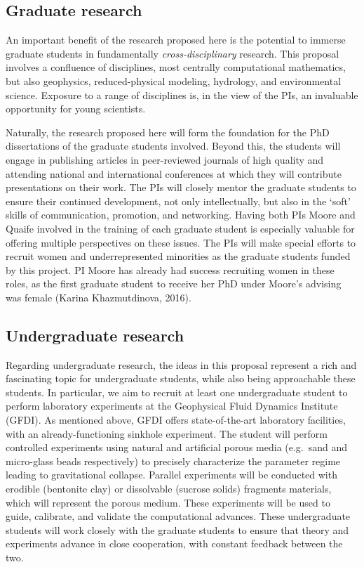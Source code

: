 \documentclass[11pt]{article}
\begin{document}
\subsection{Graduate research}

	An important benefit of the research proposed here is the potential to immerse graduate students in fundamentally {\em cross-disciplinary} research. This proposal involves a confluence of disciplines, most centrally computational mathematics, but also geophysics, reduced-physical modeling, hydrology, and environmental science. Exposure to a range of disciplines is, in the view of the PIs, an invaluable opportunity for young scientists.

	Naturally, the research proposed here will form the foundation for the PhD dissertations of the graduate students involved. Beyond this, the students will engage in publishing articles in peer-reviewed journals of high quality and attending national and international conferences at which they will contribute presentations on their work. The PIs will closely mentor the graduate students to ensure their continued development, not only intellectually, but also in the `soft' skills of communication, promotion, and networking. Having both PIs Moore and Quaife involved in the training of each graduate student is especially valuable for offering multiple perspectives on these issues. The PIs will make special efforts to recruit women and underrepresented minorities as the graduate students funded by this project. PI Moore has already had success recruiting women in these roles, as the first graduate student to receive her PhD under Moore's advising was female (Karina Khazmutdinova, 2016).


\subsection{Undergraduate research}

Regarding undergraduate research, the ideas in this proposal represent a rich and fascinating topic for undergraduate students, while also being approachable these students. In particular, we aim to recruit at least one undergraduate student to perform laboratory experiments at the Geophysical Fluid Dynamics Institute (GFDI). As mentioned above, GFDI offers state-of-the-art laboratory facilities, with an already-functioning sinkhole experiment. The student will perform controlled experiments using natural and artificial porous media (e.g.~sand and micro-glass beads respectively) to precisely characterize the parameter regime leading to gravitational collapse. Parallel experiments will be conducted with erodible (bentonite clay) or dissolvable  (sucrose solids) fragments materials, which will represent the porous medium. These experiments will be used to guide, calibrate, and validate the computational advances. These undergraduate students will work closely with the graduate students to ensure that theory and experiments advance in close cooperation, with constant feedback between the two.
\end{document}
